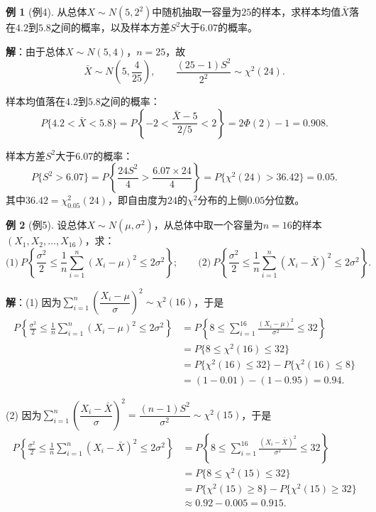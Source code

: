 \documentclass[11pt,a4paper]{report}
\theoremstyle{definition}
\newtheorem{example}{例}[chapter]
\theoremstyle{plain}
\begin{document}
\begin{example}[例4]
从总体$X\sim N(5,2^2)$中随机抽取一容量为$25$的样本，求样本均值$\bar{X}$落在$4.2$到$5.8$之间的概率，以及样本方差$S^2$大于$6.07$的概率。

\textbf{解}：由于总体$X\sim N(5,4)$，$n=25$，故
\[
\bar{X}\sim N\left(5,\frac{4}{25}\right),\qquad
\frac{(25-1)S^2}{2^2}\sim\chi^2(24).
\]

样本均值落在$4.2$到$5.8$之间的概率：
\[
P\{4.2<\bar{X}<5.8\}
=P\left\{-2<\frac{\bar{X}-5}{2/5}<2\right\}
=2\Phi(2)-1=0.908.
\]

样本方差$S^2$大于$6.07$的概率：
\[
P\{S^2>6.07\}
=P\left\{\frac{24S^2}{4}>\frac{6.07\times 24}{4}\right\}
=P\{\chi^2(24)>36.42\}=0.05.
\]
其中$36.42=\chi_{0.05}^2(24)$，即自由度为$24$的$\chi^2$分布的上侧$0.05$分位数。
\end{example}

\begin{example}[例5]
设总体$X\sim N(\mu,\sigma^2)$，从总体中取一个容量为$n=16$的样本$(X_1,X_2,\ldots,X_{16})$，求：
\[
\text{(1)}\ P\left\{\frac{\sigma^2}{2}\leq\frac{1}{n}\sum_{i=1}^{n}(X_i-\mu)^2\leq 2\sigma^2\right\};
\qquad
\text{(2)}\ P\left\{\frac{\sigma^2}{2}\leq\frac{1}{n}\sum_{i=1}^{n}(X_i-\bar{X})^2\leq 2\sigma^2\right\}.
\]

\textbf{解}：(1) 因为$\sum_{i=1}^{n}\left(\dfrac{X_i-\mu}{\sigma}\right)^2\sim\chi^2(16)$，于是
\[
\begin{aligned}
P\left\{\frac{\sigma^2}{2}\leq\frac{1}{n}\sum_{i=1}^{n}(X_i-\mu)^2\leq 2\sigma^2\right\}
&=P\left\{8\leq\sum_{i=1}^{16}\frac{(X_i-\mu)^2}{\sigma^2}\leq 32\right\}\\
&=P\{8\leq\chi^2(16)\leq 32\}\\
&=P\{\chi^2(16)\leq 32\}-P\{\chi^2(16)\leq 8\}\\
&=(1-0.01)-(1-0.95)=0.94.
\end{aligned}
\]

(2) 因为$\sum_{i=1}^{n}\left(\dfrac{X_i-\bar{X}}{\sigma}\right)^2=\dfrac{(n-1)S^2}{\sigma^2}\sim\chi^2(15)$，于是
\[
\begin{aligned}
P\left\{\frac{\sigma^2}{2}\leq\frac{1}{n}\sum_{i=1}^{n}(X_i-\bar{X})^2\leq 2\sigma^2\right\}
&=P\left\{8\leq\sum_{i=1}^{16}\frac{(X_i-\bar{X})^2}{\sigma^2}\leq 32\right\}\\
&=P\{8\leq\chi^2(15)\leq 32\}\\
&=P\{\chi^2(15)\geq 8\}-P\{\chi^2(15)\geq 32\}\\
&\approx 0.92-0.005=0.915.
\end{aligned}
\]
\end{example}
\end{document}

